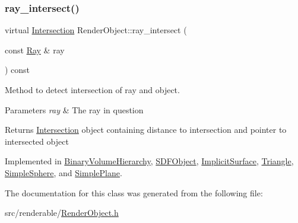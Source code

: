 \mbox{\label{classRenderObject_aa844ad2c5ef0c2b79faef2ed0af553bb}} 
\subsubsection{\texorpdfstring{ray\_intersect()}{ray\_intersect()}}
{\footnotesize\ttfamily virtual \mbox{\hyperlink{classIntersection}{Intersection}} Render\+Object\+::ray\+\_\+intersect (\begin{DoxyParamCaption}\item[{const \mbox{\hyperlink{classRay}{Ray}} \&}]{ray }\end{DoxyParamCaption}) const\hspace{0.3cm}{\ttfamily [pure virtual]}}



Method to detect intersection of ray and object. 


\begin{DoxyParams}{Parameters}
{\em ray} & The ray in question \\
\hline
\end{DoxyParams}
\begin{DoxyReturn}{Returns}
\mbox{\hyperlink{classIntersection}{Intersection}} object containing distance to intersection and pointer to intersected object 
\end{DoxyReturn}


Implemented in \mbox{\hyperlink{classBinaryVolumeHierarchy_aae4af0a21170bb122692314b0fbf399a}{Binary\+Volume\+Hierarchy}}, \mbox{\hyperlink{classSDFObject_a3870048585282b8176a05ca46ab8695d}{S\+D\+F\+Object}}, \mbox{\hyperlink{classImplicitSurface_ad9443ffe39f5c3d65e009aa2dbda81f0}{Implicit\+Surface}}, \mbox{\hyperlink{classTriangle_a1ee77d1d4ddeae939e08711b30dbf4f0}{Triangle}}, \mbox{\hyperlink{classSimpleSphere_abb50f169da7cb2acab05c8f9d56cd1e8}{Simple\+Sphere}}, and \mbox{\hyperlink{classSimplePlane_adffd7f102bed30d44cd527cb34a3a312}{Simple\+Plane}}.



The documentation for this class was generated from the following file\+:\begin{DoxyCompactItemize}
\item 
src/renderable/\mbox{\hyperlink{RenderObject_8h}{Render\+Object.\+h}}\end{DoxyCompactItemize}
